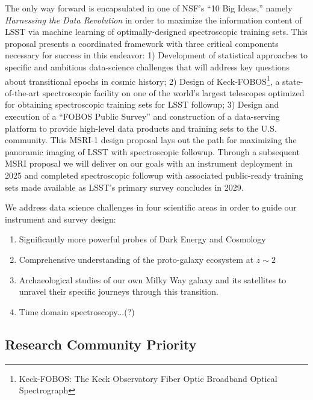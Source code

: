 \documentclass[oneside,11pt]{amsart}
\newcommand{\comment}[2][todo]{{\color{#1}[[{\bf #2}]]}}
\begin{document}
The only way forward is encapsulated in one of NSF's ``10 Big Ideas,'' namely \emph{Harnessing the Data Revolution} in
order to maximize the information content of LSST via machine learning of optimally-designed spectroscopic training
sets.  This proposal presents a coordinated framework with three critical components necessary for success in this
endeavor: 1) Development of statistical approaches to specific and ambitious data-science challenges that will address
key questions about transitional epochs in cosmic history; 2) Design of Keck-FOBOS\footnote{Keck-FOBOS: The Keck Observatory Fiber Optic Broadband Optical Spectrograph}, a state-of-the-art spectroscopic
facility on one of the world's largest telescopes optimized for obtaining spectroscopic training sets for LSST
followup; 3) Design and execution of a ``FOBOS Public Survey'' and construction of a data-serving platform to provide
high-level data products and training sets to the U.S. community.  This MSRI-1 design proposal lays out the path for
maximizing the panoramic imaging of LSST with spectroscopic followup.  Through a subsequent MSRI proposal we will
deliver on our goals with an instrument deployment in 2025 and completed spectroscopic followup with associated
public-ready training sets made available as LSST's primary survey concludes in 2029.

We address data science challenges in four scientific areas in order to guide our instrument and survey design:

\begin{enumerate}
	\item Significantly more powerful probes of Dark Energy and Cosmology
	\item Comprehensive understanding of the proto-galaxy ecosystem at $z\sim2$
	\item Archaeological studies of our own Milky Way galaxy and its satellites to unravel their specific journeys
	through this transition.
	\item Time domain spectroscopy...(?)
\end{enumerate}





\subsection{Research Community Priority} 
\label{sec:community}
\noindent\comment{3/4 page}

\end{document}
